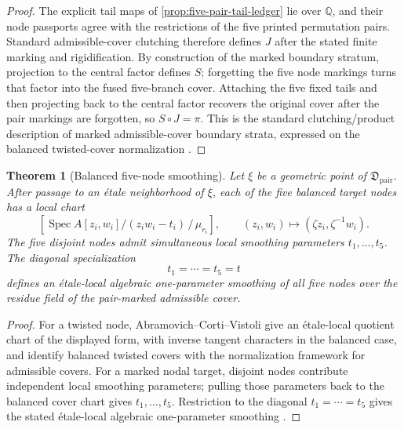 \documentclass[11pt]{article}
\newtheorem{theorem}{Theorem}[section]
\theoremstyle{remark}
\newcommand{\Q}{\mathbb Q}
\newcommand{\Spec}{\operatorname{Spec}}
\begin{document}
\begin{proof}
The explicit tail maps of \cref{prop:five-pair-tail-ledger} lie over $\Q$, and their node passports agree with the restrictions of the five printed permutation pairs.  Standard admissible-cover clutching therefore defines $J$ after the stated finite marking and rigidification.  By construction of the marked boundary stratum, projection to the central factor defines $S$; forgetting the five node markings turns that factor into the fused five-branch cover.  Attaching the five fixed tails and then projecting back to the central factor recovers the original cover after the pair markings are forgotten, so $S\circ J=\pi$.  This is the standard clutching/product description of marked admissible-cover boundary strata, expressed on the balanced twisted-cover normalization \cite{AbramovichCortiVistoli,Wewers}.
\end{proof}

\begin{theorem}[Balanced five-node smoothing]
\label{thm:five-node-smoothing}
Let $\xi$ be a geometric point of $\mathfrak D_{\mathrm{pair}}$.  After passage to an \'etale neighborhood of $\xi$, each of the five balanced target nodes has a local chart
\[
 [\Spec A[z_i,w_i]/(z_i w_i-t_i)\,/\,\mu_{r_i}],
 \qquad
 (z_i,w_i)\longmapsto(\zeta z_i,\zeta^{-1}w_i).
\]
The five disjoint nodes admit simultaneous local smoothing parameters $t_1,\ldots,t_5$.  The diagonal specialization
\[
 t_1=\cdots=t_5=t
\]
defines an \'etale-local algebraic one-parameter smoothing of all five nodes over the residue field of the pair-marked admissible cover.
\end{theorem}

\begin{proof}
For a twisted node, Abramovich--Corti--Vistoli give an \'etale-local quotient chart of the displayed form, with inverse tangent characters in the balanced case, and identify balanced twisted covers with the normalization framework for admissible covers.  For a marked nodal target, disjoint nodes contribute independent local smoothing parameters; pulling those parameters back to the balanced cover chart gives $t_1,\ldots,t_5$.  Restriction to the diagonal $t_1=\cdots=t_5$ gives the stated \'etale-local algebraic one-parameter smoothing \cite{AbramovichCortiVistoli}.
\end{proof}
\end{document}
